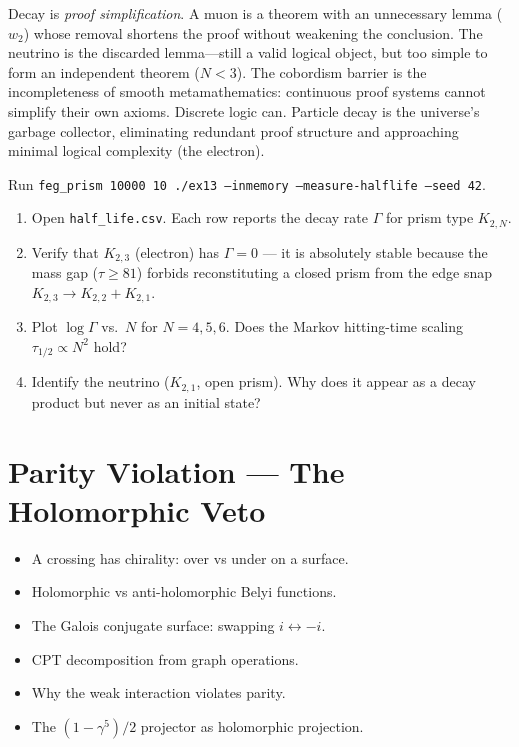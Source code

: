 \documentclass[11pt, a4paper, openany]{book}
\newenvironment{introduction}[1][Modulo Overview]{%
  \begin{tcolorbox}[
    enhanced,colback=structure!5,colframe=structure,
    colbacktitle=structure,coltitle=white,
    fonttitle=\small\bfseries,title={#1},
    arc=2pt,boxrule=0.7pt,
    left=8pt,right=8pt,top=6pt,bottom=6pt,
    before skip=12pt,after skip=12pt
  ]\itshape\begin{itemize}[leftmargin=*,itemsep=2pt,parsep=0pt]
}{%
  \end{itemize}\end{tcolorbox}
}
\begin{document}
\begin{logicalreading}
Decay is \emph{proof simplification}. A muon is a theorem with an
unnecessary lemma ($w_2$) whose removal shortens the proof without
weakening the conclusion. The neutrino is the discarded lemma---still
a valid logical object, but too simple to form an independent theorem
($N < 3$). The cobordism barrier is the incompleteness of smooth
metamathematics: continuous proof systems cannot simplify their own
axioms. Discrete logic can. Particle decay is the universe's garbage
collector, eliminating redundant proof structure and approaching
minimal logical complexity (the electron).
\end{logicalreading}

\begin{simulation}
Run \texttt{feg\_prism 10000 10 ./ex13 --inmemory --measure-halflife --seed 42}.
\begin{enumerate}
\item Open \texttt{half\_life.csv}. Each row reports the decay rate $\Gamma$ for prism type $K_{2,N}$.
\item Verify that $K_{2,3}$ (electron) has $\Gamma = 0$ --- it is absolutely stable because the mass gap ($\tau \geq 81$) forbids reconstituting a closed prism from the edge snap $K_{2,3} \to K_{2,2} + K_{2,1}$.
\item Plot $\log\Gamma$ vs.\ $N$ for $N = 4, 5, 6$. Does the Markov hitting-time scaling $\tau_{1/2} \propto N^2$ hold?
\item Identify the neutrino ($K_{2,1}$, open prism). Why does it appear as a decay product but never as an initial state?
\end{enumerate}
\end{simulation}


\chapter{Parity Violation --- The Holomorphic Veto}\label{ch:parity}

\begin{introduction}
  \item A crossing has chirality: over vs under on a surface.
  \item Holomorphic vs anti-holomorphic Belyi functions.
  \item The Galois conjugate surface: swapping $i \leftrightarrow -i$.
  \item CPT decomposition from graph operations.
  \item Why the weak interaction violates parity.
  \item The $(1 - \gamma^5)/2$ projector as holomorphic projection.
\end{introduction}
\end{document}
